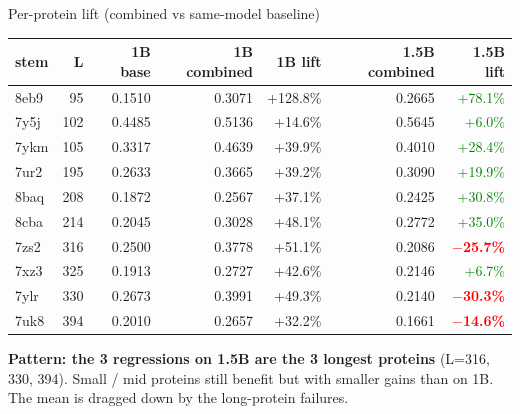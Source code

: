 \documentclass[aspectratio=169,11pt]{beamer}
\begin{document}
\begin{frame}{Per-protein lift (combined vs same-model baseline)}
  \begin{center}
    \begin{tabular}{lrrrrrr}
      \toprule
      stem & L & 1B base & 1B combined & 1B lift & 1.5B combined & 1.5B lift\\
      \midrule
      8eb9 &  95 & 0.1510 & 0.3071 & +128.8\% & 0.2665 & \textcolor{green}{+78.1\%}\\
      7y5j & 102 & 0.4485 & 0.5136 & +14.6\%  & 0.5645 & \textcolor{green}{+6.0\%}\\
      7ykm & 105 & 0.3317 & 0.4639 & +39.9\%  & 0.4010 & \textcolor{green}{+28.4\%}\\
      7ur2 & 195 & 0.2633 & 0.3665 & +39.2\%  & 0.3090 & \textcolor{green}{+19.9\%}\\
      8baq & 208 & 0.1872 & 0.2567 & +37.1\%  & 0.2425 & \textcolor{green}{+30.8\%}\\
      8cba & 214 & 0.2045 & 0.3028 & +48.1\%  & 0.2772 & \textcolor{green}{+35.0\%}\\
      7zs2 & 316 & 0.2500 & 0.3778 & +51.1\%  & 0.2086 & \textcolor{red}{\textbf{$-$25.7\%}}\\
      7xz3 & 325 & 0.1913 & 0.2727 & +42.6\%  & 0.2146 & \textcolor{green}{+6.7\%}\\
      7ylr & 330 & 0.2673 & 0.3991 & +49.3\%  & 0.2140 & \textcolor{red}{\textbf{$-$30.3\%}}\\
      7uk8 & 394 & 0.2010 & 0.2657 & +32.2\%  & 0.1661 & \textcolor{red}{\textbf{$-$14.6\%}}\\
      \bottomrule
    \end{tabular}
  \end{center}
  \vspace{0.4em}
  {\small\color{navy}\textbf{Pattern: the 3 regressions on 1.5B are the
    3 longest proteins} (L=316, 330, 394). Small / mid proteins still
    benefit but with smaller gains than on 1B. The mean is dragged down
    by the long-protein failures.}
\end{frame}
\end{document}
